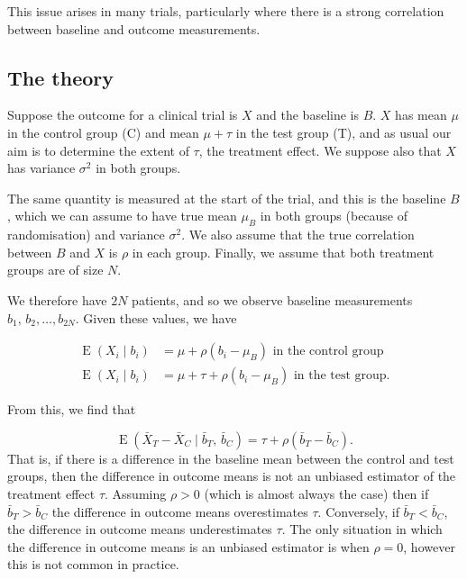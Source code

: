 \documentclass[
  openany]{book}
\theoremstyle{definition}
\theoremstyle{definition}
\theoremstyle{definition}
\theoremstyle{definition}
\theoremstyle{remark}
\begin{document}
This issue arises in many trials, particularly where there is a strong correlation between baseline and outcome measurements.

\hypertarget{ancovatheory}{%
\subsection{The theory}\label{ancovatheory}}

Suppose the outcome for a clinical trial is \(X\) and the baseline is \(B\). \(X\) has mean \(\mu\) in the control group (C) and mean \(\mu+\tau\) in the test group (T), and as usual our aim is to determine the extent of \(\tau\), the treatment effect. We suppose also that \(X\) has variance \(\sigma^2\) in both groups.

The same quantity is measured at the start of the trial, and this is the baseline \(B\), which we can assume to have true mean \(\mu_B\) in both groups (because of randomisation) and variance \(\sigma^2\). We also assume that the true correlation between \(B\) and \(X\) is \(\rho\) in each group. Finally, we assume that both treatment groups are of size \(N\).

We therefore have \(2N\) patients, and so we observe baseline measurements \(b_1,\,b_2,\ldots,b_{2N}\). Given these values, we have

\[
\begin{aligned}
\operatorname{E}\left(X_i\mid{b_i}\right) &= \mu + \rho\left(b_i - \mu_B\right)\text{ in the control group}\\
\operatorname{E}\left(X_i\mid{b_i}\right) &= \mu +\tau + \rho\left(b_i - \mu_B\right)\text{ in the test group.}
\end{aligned}
\]

From this, we find that

\begin{equation}
\operatorname{E}\left(\bar{X}_T - \bar{X}_C\mid{\bar{b}_T,\,\bar{b}_C}\right) = \tau + \rho\left(\bar{b}_T - \bar{b}_C\right). 
\label{eq:diffexp}
\end{equation}
That is, if there is a difference in the baseline mean between the control and test groups, then the difference in outcome means is not an unbiased estimator of the treatment effect \(\tau\). Assuming \(\rho>0\) (which is almost always the case) then if \(\bar{b}_T>\bar{b}_C\) the difference in outcome means overestimates \(\tau\). Conversely, if \(\bar{b}_T<\bar{b}_C\), the difference in outcome means underestimates \(\tau\). The only situation in which the difference in outcome means is an unbiased estimator is when \(\rho=0\), however this is not common in practice.
\end{document}
